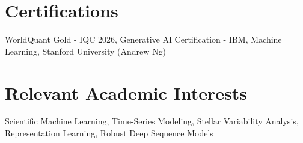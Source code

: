 \documentclass[a4paper,10pt]{article}
\begin{document}
\section{Certifications}

     WorldQuant Gold - IQC 2026, Generative AI Certification - IBM, Machine Learning, Stanford University (Andrew Ng)


\section{Relevant Academic Interests}

Scientific Machine Learning, Time-Series Modeling, Stellar Variability Analysis, Representation Learning, Robust Deep Sequence Models
\end{document}
